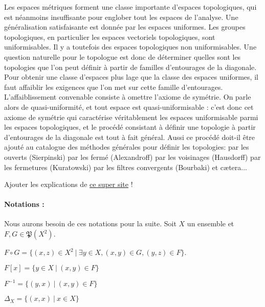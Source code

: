 \documentclass[a4paper, 11pt, french]{book}
\newenvironment{itemise}{\itemize}{\enditemize}
\let\colour=\color
\theoremstyle{plain} %
\theoremstyle{definition} %
\theoremstyle{remark} %
\newcommand{\1}{\mathds{1}}
\newcommand{\inv}[1]{#1^{-1}}
\renewcommand{\frak}[1]{\mathfrak{#1}}
\newcommand\ens[2]{\{#1 \ |\ #2\}}
\begin{document}
Les espaces métriques forment une classe importante d'espaces topologiques, qui est néanmoins insuffisante pour englober tout les espaces de l'analyse.
Une généralisation satisfaisante est donnée par les espaces uniformes.
Les groupes topologiques, en particulier les espaces vectoriels topologiques, sont uniformisables.
Il y a toutefois des espaces topologiques non uniformisables.
Une question naturelle pour le topologue est donc de déterminer quelles sont les topologies que l'on peut définir à partir de familles d'entourages de la diagonale.
Pour obtenir une classe d'espaces plus lage que la classe des espaces uniformes, il faut affaiblir les exigences que l'on met sur cette famille d'entourages.
L'affaiblissement convenable consiste à omettre l'axiome de symétrie.
On parle alors de quasi-uniformité, et tout espace est quasi-uniformisable : c'est donc cet axiome de symétrie qui caractérise véritablement les espaces uniformisable parmi les espaces topologiques, et le procédé consistant à définir une topologie à partir d'entourages de la diagonale est tout à fait général.
Aussi ce procédé doit-il être ajouté au catalogue des méthodes générales pour définir les topologies: par les ouverts (Sierpinski) par les fermé (Alexandroff) par les voisinages (Hausdorff) par les fermetures (Kuratowski) par les filtres convergents (Bourbaki) et cætera...

{\colour{red} Ajouter les explications de \href{https://projects.lsv.ens-paris-saclay.fr/topology/?page_id=2869}{ce super site} !}

\paragraph{Notations :}
Nous aurons besoin de ces notations pour la suite.
Soit $X$ un ensemble et $F, G\in\frak{P}(X^2)$.
\begin{itemise}
	\item $F\circ G=\ens{(x, z)\in X^2}{\exists y\in X, (x, y)\in G, (y, z)\in F}$.
	\item $F[x]=\ens{y\in X}{(x, y)\in F}$
	\item $\inv{F}=\ens{(y, x)}{(x, y)\in F}$
	\item $\Delta_X=\ens{(x, x)}{x\in X}$
\end{itemise}
\end{document}
